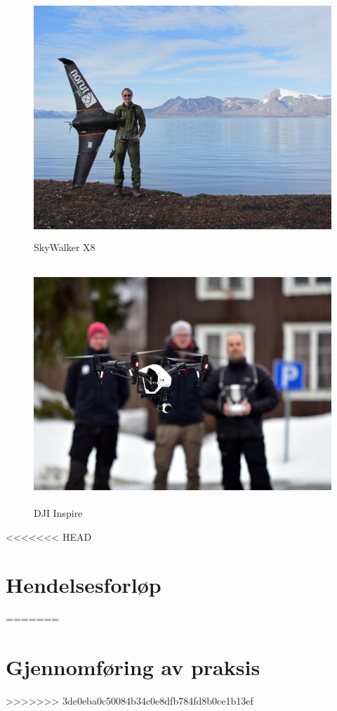 \documentclass[12pt, a4paper]{article}
\begin{document}
\begin{figure}[hpbt]
	\centering
	\includegraphics[width=.6\textwidth, height=9cm]{bilder/SkyWalker_X8.jpg}
	\caption{SkyWalker X8}
\end{figure}

\begin{figure}[h!]
	\centering
	\includegraphics[width = .6\textwidth, height = 9cm]{bilder/Dji_inspire.jpg}
	\caption{DJI Inspire}
\end{figure}

<<<<<<< HEAD

\newpage
\section{Hendelsesforløp}
=======
\newpage
\section{Gjennomføring av praksis}
>>>>>>> 3de0eba0c50084b34c0e8dfb784fd8b0ce1b13ef
\end{document}

